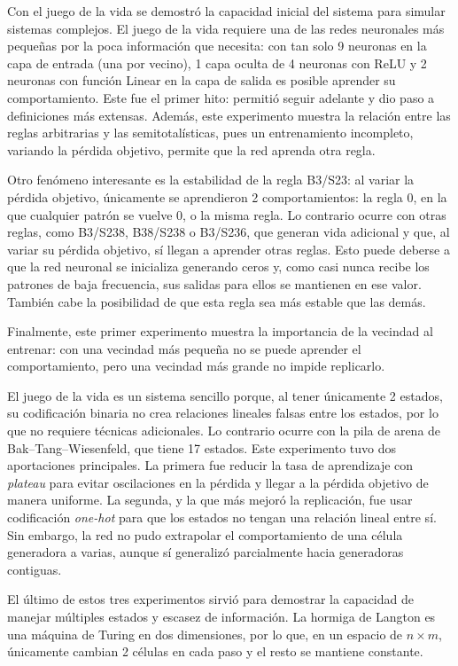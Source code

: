 Con el juego de la vida se demostró la capacidad inicial del sistema para simular sistemas complejos. El juego de la vida requiere una de las redes neuronales más pequeñas por la poca información que necesita: con tan solo 9 neuronas en la capa de entrada (una por vecino), 1 capa oculta de 4 neuronas con ReLU y 2 neuronas con función Linear en la capa de salida es posible aprender su comportamiento. Este fue el primer hito: permitió seguir adelante y dio paso a definiciones más extensas. Además, este experimento muestra la relación entre las reglas arbitrarias y las semitotalísticas, pues un entrenamiento incompleto, variando la pérdida objetivo, permite que la red aprenda otra regla.

Otro fenómeno interesante es la estabilidad de la regla B3/S23: al variar la pérdida objetivo, únicamente se aprendieron 2 comportamientos: la regla 0, en la que cualquier patrón se vuelve 0, o la misma regla. Lo contrario ocurre con otras reglas, como B3/S238, B38/S238 o B3/S236, que generan vida adicional y que, al variar su pérdida objetivo, sí llegan a aprender otras reglas. Esto puede deberse a que la red neuronal se inicializa generando ceros y, como casi nunca recibe los patrones de baja frecuencia, sus salidas para ellos se mantienen en ese valor. También cabe la posibilidad de que esta regla sea más estable que las demás.

Finalmente, este primer experimento muestra la importancia de la vecindad al entrenar: con una vecindad más pequeña no se puede aprender el comportamiento, pero una vecindad más grande no impide replicarlo.

El juego de la vida es un sistema sencillo porque, al tener únicamente 2 estados, su codificación binaria no crea relaciones lineales falsas entre los estados, por lo que no requiere técnicas adicionales. Lo contrario ocurre con la pila de arena de Bak–Tang–Wiesenfeld, que tiene 17 estados. Este experimento tuvo dos aportaciones principales. La primera fue reducir la tasa de aprendizaje con \textit{plateau} para evitar oscilaciones en la pérdida y llegar a la pérdida objetivo de manera uniforme. La segunda, y la que más mejoró la replicación, fue usar codificación \textit{one-hot} para que los estados no tengan una relación lineal entre sí. Sin embargo, la red no pudo extrapolar el comportamiento de una célula generadora a varias, aunque sí generalizó parcialmente hacia generadoras contiguas.


El último de estos tres experimentos sirvió para demostrar la capacidad de manejar múltiples estados y escasez de información. La hormiga de Langton es una máquina de Turing en dos dimensiones, por lo que, en un espacio de $n \times m$, únicamente cambian 2 células en cada paso y el resto se mantiene constante.

